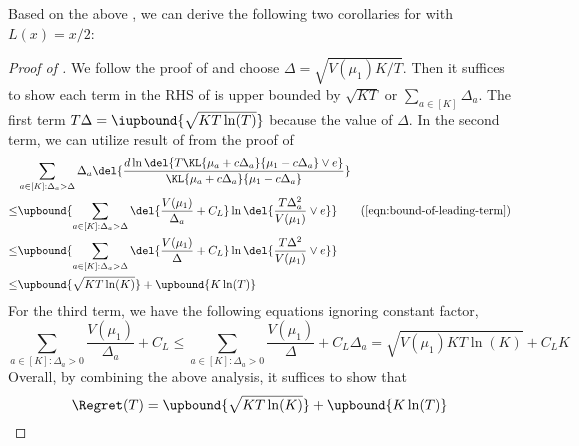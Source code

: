 Based on the above , we can derive the following two corollaries for \expklms with $L(x) = x/2$:
\constantminimax*
\constantsubucb*


\begin{proof}[Proof of ]
    We follow the proof of  and choose $\Delta = \sqrt{V(\mu_1)K/T}$. Then it suffices to show each term in the RHS of  is upper bounded by $\sqrt{KT}$ or $\sum_{a\in[K]} \Delta_a$.
    The first term $T \Delta = \iupbound{\sqrt{KT \ln(T)}}$ because the value of $\Delta$.
    In the second term, we can utilize result of  from the proof of 
    \begin{align*}
        &\sum_{a\in[K]: \Delta_a > \Delta} \Delta_a \del{\frac{d\ln\del{T\KL{\mu_a+c\Delta_a}{\mu_1-c\Delta_a} \vee e}}{\KL{\mu_a+c\Delta_a}{\mu_1-c\Delta_a}}}
                \nonumber
        \\
        \leq&
        \upbound{ \sum_{a\in[K]: \Delta_a > \Delta} \del{\frac{V(\mu_1)}{\Delta_a} + C_L}\ln\del{\frac{T\Delta_a^2}{V(\mu_1)} \vee e}}
                \tag{\Cref{eqn:bound-of-leading-term}}
        \\
        \leq&
        \upbound{ \sum_{a\in[K]: \Delta_a > \Delta} \del{\frac{V(\mu_1)}{\Delta} + C_L}\ln\del{\frac{T\Delta^2}{V(\mu_1)} \vee e}}
        \\
        \leq&
        \upbound{ \sqrt{KT \ln(K)}} + \upbound{K\ln(T)}
    \end{align*}
    For the third term, we have the following equations ignoring constant factor,
    \[
        \sum_{a\in[K]: \Delta_a > 0}  \frac{V(\mu_1)}{\Delta_a} + C_L
        \leq
        \sum_{a\in[K]: \Delta_a > 0} \frac{V(\mu_1)}{\Delta} + C_L \Delta_a
        =
        \sqrt{V(\mu_1)KT \ln(K)} + C_L K
    \]
    Overall, by combining the above analysis, it suffices to show that
    \[
        \Regret(T) = \upbound{\sqrt{KT \ln(K)}} + \upbound{K \ln(T)}
    \]
\end{proof}

